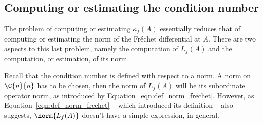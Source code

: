 \subsection{Computing or estimating the condition number}\label{subs:compute_estimate_cond}
The problem of computing or estimating $\kappa_f(A)$ essentially reduces that of computing or estimating the norm of the Fréchet differential at $A$. There are two aspects to this last problem, namely the computation of $L_f(A)$ and the computation, or estimation, of its norm. 

Recall that the condition number is defined with respect to a norm. A norm on $\C{n}{n}$ has to be chosen, then the norm of $L_f(A)$ will be its subordinate operator norm, as introduced by Equation~\eqref{eqn:def_norm_frechet}. However, as Equation~\eqref{eqn:def_norm_frechet} -- which introduced its definition -- also suggests, $\norm{L_f(A)}$ doesn't have a simple expression, in general. 

